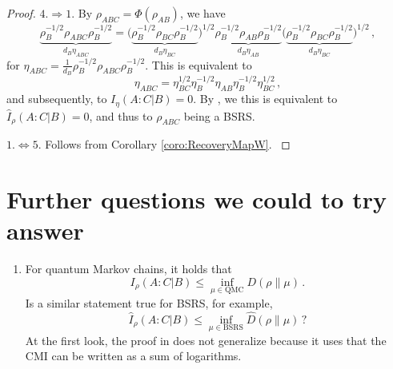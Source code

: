 \documentclass[11pt]{article}
\theoremstyle{newdefinition}
\theoremstyle{newplain}
\theoremstyle{myplain}
\DeclareMathOperator{\1}{\mathds{1}}
\newcommand{\PCR}[1]{{\color{blue}#1}}
\begin{document}
{\begin{proof}
     \vspace{0.2cm}
     
\noindent \underline{$4. \Rightarrow 1. $} By $\rho_{ABC}= \Phi(\rho_{AB}) $, we have 
\begin{equation}
    \underbrace{\rho_B^{-1/2} \rho_{ABC} \rho_B^{-1/2}}_{d_B \eta_{ABC}}   = \Big( \underbrace{ \rho_B^{-1/2}\rho_{BC}\rho_B^{-1/2}   }_{d_B \eta_{BC}}\Big)^{1/2} \underbrace{\rho_B^{-1/2}\rho_{AB}\rho_B^{-1/2} }_{d_B \eta_{AB}}\Big( \underbrace{ \rho_B^{-1/2}\rho_{BC}\rho_B^{-1/2} }_{d_B \eta_{BC}}  \Big)^{1/2} \, ,
\end{equation}
for $\eta_{ABC} = \frac{1}{d_B} \rho_B^{-1/2} \rho_{ABC} \rho_B^{-1/2}$. This is equivalent to
\begin{equation}
    \eta_{ABC} = \eta_{BC}^{1/2} \eta_{B}^{-1/2}  \eta_{AB} \eta_{B}^{-1/2} \eta_{BC}^{1/2} \, , 
\end{equation}
and subsequently, to $I_\eta (A:C | B) = 0$. By , we this is equivalent to $\widehat{I}_\rho (A:C |B)= 0$, and thus to $\rho_{ABC}$ being a BSRS.

     \vspace{0.2cm}

\PCR{
\noindent  \underline{$1. \Leftrightarrow 5. $} Follows from Corollary \ref{coro:RecoveryMapW}.
    }
\end{proof}

\section{Further questions we could to try answer}

\begin{enumerate}
    \item For quantum Markov chains, it holds that \cite[Lemma 5.12]{sutter2018approximate}
    \begin{equation} \label{eq:upper-bounds_CMI-distance-to-QMC}
        I_\rho(A:C|B) \leq \inf_{\mu \in \mathrm{QMC}} D(\rho\|\mu)\, .
    \end{equation}
    Is a similar statement true for BSRS, for example,
    \begin{equation}
        \hat I_\rho(A:C|B) \leq \inf_{\mu \in \mathrm{BSRS}} \hat D(\rho\|\mu)\, ?
    \end{equation}
    At the first look, the proof in \cite{sutter2018approximate} does not generalize because it uses that the CMI can be written as a sum of logarithms.
    

\end{enumerate}}
\end{document}
